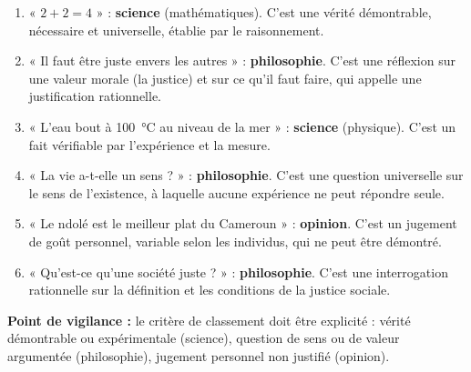 \documentclass[11pt]{article}
\begin{document}
\begin{corrige}
\begin{enumerate}
\item « $2+2=4$ » : \textbf{science} (mathématiques). C'est une vérité démontrable, nécessaire et universelle, établie par le raisonnement.
\item « Il faut être juste envers les autres » : \textbf{philosophie}. C'est une réflexion sur une valeur morale (la justice) et sur ce qu'il faut faire, qui appelle une justification rationnelle.
\item « L'eau bout à \SI{100}{\celsius} au niveau de la mer » : \textbf{science} (physique). C'est un fait vérifiable par l'expérience et la mesure.
\item « La vie a-t-elle un sens ? » : \textbf{philosophie}. C'est une question universelle sur le sens de l'existence, à laquelle aucune expérience ne peut répondre seule.
\item « Le ndolé est le meilleur plat du Cameroun » : \textbf{opinion}. C'est un jugement de goût personnel, variable selon les individus, qui ne peut être démontré.
\item « Qu'est-ce qu'une société juste ? » : \textbf{philosophie}. C'est une interrogation rationnelle sur la définition et les conditions de la justice sociale.
\end{enumerate}
\textbf{Point de vigilance :} le critère de classement doit être explicité : vérité démontrable ou expérimentale (science), question de sens ou de valeur argumentée (philosophie), jugement personnel non justifié (opinion).
\end{corrige}
\end{document}
